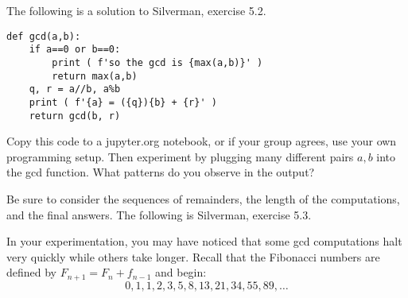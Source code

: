 \documentclass[12pt]{exam}
\begin{document}
\begin{questions}
  \question The following is a solution to Silverman, exercise 5.2.
  \begin{lstlisting}
def gcd(a,b):
    if a==0 or b==0:
        print ( f'so the gcd is {max(a,b)}' )
        return max(a,b)
    q, r = a//b, a%b
    print ( f'{a} = ({q}){b} + {r}' )
    return gcd(b, r)
  \end{lstlisting}
  Copy this code to a jupyter.org notebook, or if your group agrees, use your own programming setup. Then experiment by plugging many different pairs $a,b$ into the gcd function. What patterns do you observe in the output?
  
  Be sure to consider the sequences of remainders, the length of the computations, and the final answers.
  \newpage
  \question The following is Silverman, exercise 5.3.
  \newpage
  \question In your experimentation, you may have noticed that some gcd computations halt very quickly while others take longer. Recall that the Fibonacci numbers are defined by $F_{n+1}=F_n+f_{n-1}$ and begin:
  \[0,1,1,2,3,5,8,13,21,34,55,89,\ldots
  \]
\end{questions}
\end{document}
